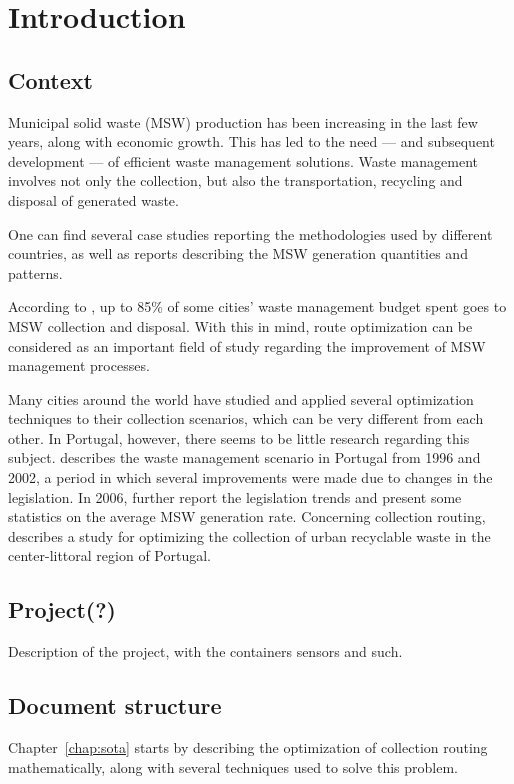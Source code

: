 \chapter{Introduction} \label{chap:intro}

\section*{}


\section{Context}

Municipal solid waste (MSW) production has been increasing in the last few
years, along with economic growth\citep{McCarthy94}. This has led to the need
--- and subsequent development --- of efficient waste management solutions.
Waste management involves not only the collection, but also the transportation,
recycling and disposal of generated waste.

One can find several case studies reporting the methodologies used by different
countries, as well as reports describing the MSW generation quantities and
patterns.

According to \citet{Bhat1996}, up to 85\% of some cities' waste management
budget spent goes to MSW collection and disposal. With this in mind, route
optimization can be considered as an important field of study regarding the
improvement of MSW management processes.

Many cities around the world have studied and applied several optimization
techniques to their collection scenarios, which can be very different from each
other. In Portugal, however, there seems to be little research regarding this
subject. \citet{Passaro200397} describes the waste management scenario in
Portugal from 1996 and 2002, a period in which several improvements were made
due to changes in the legislation. In 2006, \citet{Magrinho20061477} further
report the legislation trends and present some statistics on the average MSW
generation rate. Concerning collection routing, \citet{Teixeira04} describes a
study for optimizing the collection of urban recyclable waste in the
center-littoral region of Portugal.


\section{Project(?)}
Description of the project, with the containers sensors and such.

\section{Document structure}


Chapter~\ref{chap:sota} starts by describing the optimization of collection
routing mathematically, along with several techniques used to solve this
problem.



